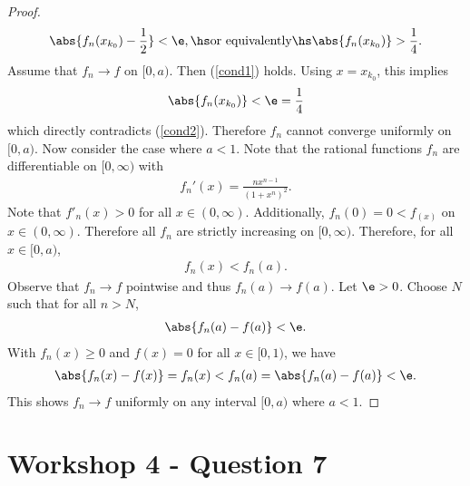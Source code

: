 \documentclass{article}
\begin{document}
\begin{proof}
\begin{align}
      \abs{f_n(x_{k_0}) - \frac{1}{2}} < \e, \hs\text{or equivalently}\hs \abs{f_n(x_{k_0})} > \frac{1}{4}.
   \end{align}
   Assume that $f_n\to f$ on $[0, a)$. Then (\ref{cond1}) holds. Using $x=x_{k_0}$, this implies 
   \begin{align*}
      \abs{f_n(x_{k_0})} < \e = \frac{1}{4}
   \end{align*}
   which directly contradicts (\ref{cond2}). Therefore $f_n$ cannot converge uniformly on $[0, a)$.
   Now consider the case where $a<1$. 
   Note that the rational functions $f_n$ are differentiable on $[0, \infty)$ with 
   \begin{align*}
      f_n'(x) =  \frac{nx^{n-1}}{(1+x^n)^2}.
   \end{align*}
   Note that $f'_n(x)>0$ for all $x\in(0,\infty)$. Additionally, $f_n(0) = 0 < f_(x)$ on $x\in(0, \infty)$.
   Therefore all $f_n$ are strictly increasing on $[0, \infty)$. Therefore, for all $x\in[0,a)$,
   \begin{align}
      f_n(x) < f_n(a). 
   \end{align}
   Observe that $f_n\to f$ pointwise and thus $f_n(a)\to f(a)$. Let $\e>0$. Choose $N$ such that 
   for all $n>N$, 
   \begin{align*}
      \abs{f_n(a)-f(a)} < \e.
   \end{align*}
   With $f_n(x)\geq 0$ and $f(x)=0$ for all $x\in[0,1)$, we have 
   \begin{align*}
      \abs{f_n(x)-f(x)}=f_n(x)<f_n(a)=\abs{f_n(a) - f(a)} < \e. 
   \end{align*}
   This shows $f_n\to f$ uniformly on any interval $[0, a)$ where $a<1$.
\end{proof}

\section*{Workshop 4 - Question 7}
\end{document}
